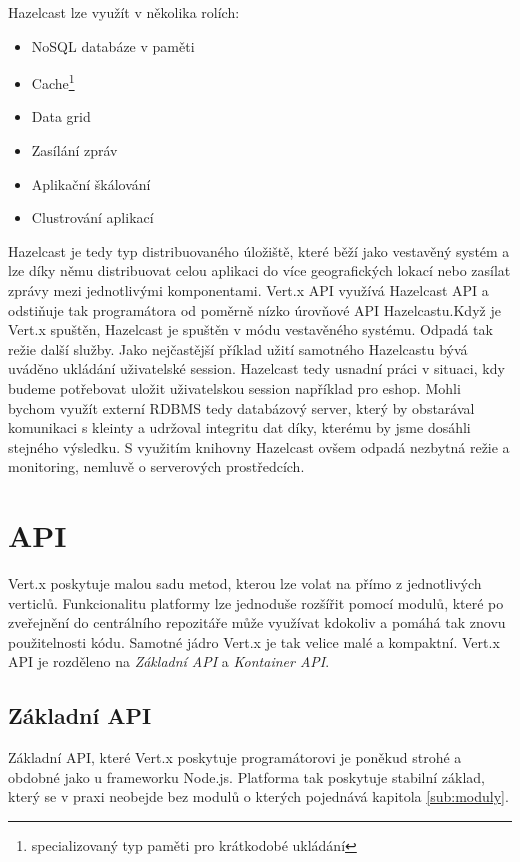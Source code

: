 Hazelcast lze využít v několika rolích:
\begin{itemize}
\item{NoSQL databáze v paměti}
\item{Cache\footnote{specializovaný typ paměti pro krátkodobé ukládání}}
\item{Data grid}
\item{Zasílání zpráv}
\item{Aplikační škálování}
\item{Clustrování aplikací}
\end{itemize}

Hazelcast je tedy typ distribuovaného úložiště, které běží jako vestavěný systém a lze díky němu distribuovat celou aplikaci do více geografických lokací nebo zasílat zprávy mezi jednotlivými komponentami. Vert.x API využívá Hazelcast API a odstiňuje tak programátora od poměrně nízko úrovňové API Hazelcastu.Když je Vert.x spuštěn, Hazelcast je spuštěn v módu vestavěného systému. Odpadá tak režie další služby. Jako nejčastější příklad užití samotného Hazelcastu bývá uváděno ukládání uživatelské session\cite{session}. Hazelcast tedy usnadní práci v situaci, kdy budeme potřebovat uložit uživatelskou session například pro eshop. Mohli bychom využít externí RDBMS tedy databázový server, který by obstarával komunikaci s kleinty a udržoval integritu dat díky, kterému by jsme dosáhli stejného výsledku. S využitím knihovny Hazelcast ovšem odpadá nezbytná režie a monitoring, nemluvě o serverových prostředcích.

\section{API}\label{sub:API}

Vert.x poskytuje malou sadu metod, kterou lze volat na přímo z jednotlivých verticlů.
Funkcionalitu platformy lze jednoduše rozšířit pomocí modulů, které po zveřejnění do centrálního repozitáře může využívat kdokoliv a pomáhá tak znovu použitelnosti kódu. Samotné jádro Vert.x je tak velice malé a kompaktní. Vert.x API je rozděleno na \emph{Základní API} a \emph{Kontainer API}.

\subsection{Základní API}\label{sub:coreAPI}

Základní API, které Vert.x poskytuje programátorovi je poněkud strohé a obdobné jako u frameworku Node.js. Platforma tak poskytuje stabilní základ, který se v praxi neobejde bez modulů o kterých pojednává kapitola \ref{sub:moduly}.

